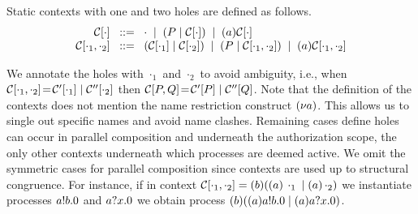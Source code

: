 \begin{definition}
Static contexts with one and two holes are defined as follows.
\[
\displaystyle
\begin{array}[t]{@{}r@{\;\;}c@{\;\;}l@{}}
  \context[\cdot] \;& ::= &\; \cdot \;\; | \;\; (\PP\parop \context[\cdot]) \;\; | \;\; \scope{\NA} \context[\cdot] \\
 \context[\cdot_1, \cdot_2] \; &::=& \; (\context[\cdot_1]\parop\context[\cdot_2])
\;\; | \;\;  (\PP\parop \context[\cdot_1, \cdot_2]) \;\; | \;\; \scope{\NA} \context[\cdot_1, \cdot_2] 
\end{array}
\]
\end{definition}

We annotate the holes with $\cdot_1$ and $\cdot_2$ to avoid ambiguity, i.e., when
$ \mathcal{C}[\cdot_1, \cdot_2] \!=\! \mathcal{C}'[\cdot_1]\;|\;\mathcal{C}''[\cdot_2]$ then
$ \mathcal{C}[P, Q] \!=\! \mathcal{C}'[P]\;|\;\mathcal{C}''[Q]$.
Note that
the definition of the contexts does not mention the name restriction construct $(\nu a)$. This allows us to single out specific names and avoid name clashes. Remaining cases define holes can occur in parallel composition and underneath the authorization scope, the only other contexts underneath which processes are deemed active. We omit the symmetric cases for parallel 
composition since contexts are used up to structural congruence.
For instance, if in context $\mathcal{C}[\cdot_1, \cdot_2]=(b)((a) \,\cdot_1 \;|\; (a) \,\cdot_2)$
 we instantiate processes $a!b.0 $ and $a?x.0$ we obtain process
$
(b)((a)a!b.0 
\;|\; 
(a)a?x.0)$.

